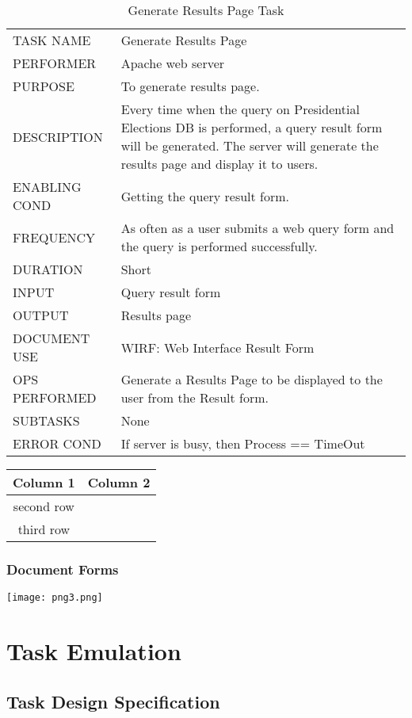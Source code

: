 \documentclass{article}
\begin{document}
\begin{table}[h!]
  \centering
  \caption{Generate Results Page Task}
  \label{tab:table8}
  \begin{tabular}{lp{10cm}}
       \hline
     TASK NAME & Generate Results Page\\
     PERFORMER & Apache web server\\
     PURPOSE & To generate results page.\\
     DESCRIPTION & Every time when the query on Presidential Elections DB is performed, a query result form will be generated. The server will generate the results page and display it to users.\\
     ENABLING COND & Getting the query result form.\\
     FREQUENCY & As often as a user submits a web query form and the query is performed successfully.\\
     DURATION & Short\\
     INPUT & Query result form\\
     OUTPUT & Results page\\
     DOCUMENT USE & WIRF: Web Interface Result Form\\
     OPS PERFORMED &  Generate a Results Page to be displayed to the user from the Result form.\\
     SUBTASKS & None\\
     ERROR COND &  If server is busy, then Process == TimeOut\\
       \hline
  \end{tabular}
\end{table}

\begin{tabular}{|c|c|}
        \hline
        Column 1 & Column 2\\
        \hline
        second row & \\
        third row & \\
        \hline
\end{tabular}


\subsubsection{Document Forms}
\texttt{[image: png3.png]}

\section {Task Emulation}
\subsection{Task Design Specification}
\end{document}
